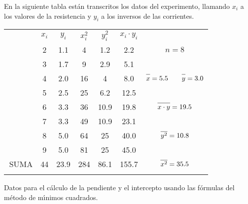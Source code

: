 \documentclass[10pd,hyperref={colorlinks=true}]{beamer}
\begin{document}
\begin{frame}{}

En la siguiente tabla est\'an transcritos los datos del experimento, 
llamando $x_i$ a los valores de la resistencia y $y_i$ a los inversos de 
las corrientes.

\begin{table}
\centering
\begin{tabular}{c|c@{\quad}|@{\quad}c@{\quad}|@{\quad}c@{\quad}|@{\quad}c@{\quad}|@{\quad}c@{\quad}|c|}\cline{2-7}
        &$x_i$  &$y_i$  &$x_i^2$        &$y_i^2$        &$x_i\cdot y_i$ &               \\ \cline{2-6}
        &2      &1.1    &4              &1.2            &2.2            &$n = 8$        \\ \cline{2-6}
        &3      &1.7    &9              &2.9            &5.1            &               \\ \cline{2-6}
        &4      &2.0    &16             &4              &8.0            &$\overline{\mathstrut x} = 5.5\qquad\overline{\mathstrut y}=3.0$\\\cline{2-6}
        &5      &2.5    &25             &6.2            &12.5           &               \\ \cline{2-6}
        &6      &3.3    &36             &10.9           &19.8           &$\overline{\mathstrut x \cdot y} = 19.5 $\\ \cline{2-6}
        &7      &3.3    &49             &10.9           &23.1           &               \\ \cline{2-6}
        &8      &5.0    &64             &25             &40.0           &$\overline{\mathstrut y^2} = 10.8$\\ \cline{2-6}
        &9      &5.0    &81             &25             &45.0           &               \\ \cline{1-6}
\hspace{-0.24cm}\vline
\,SUMA  &44     &23.9   &284            &86.1           &155.7          &$\overline{\mathstrut x^2} = 35.5$\\
\lasthline
\end{tabular}
\end{table}
Datos para el c\'alculo de la pendiente y el intercepto 
usando las f\'ormulas del m\'etodo de m\'{\i}nimos cuadrados.

 \end{frame}

\end{document}
